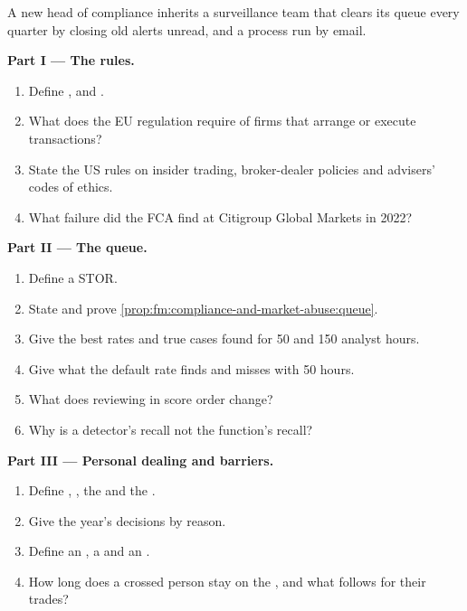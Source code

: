 \begin{problem}\label{pb:fm:compliance-and-market-abuse:1}
A new head of compliance inherits a surveillance team that clears its queue every quarter by closing old alerts unread, and a  process
run by email.

\medskip\noindent\textbf{Part I --- The rules.}
\begin{enumerate}
\item Define ,  and .
\item What does the EU regulation require of firms that arrange or execute transactions?
\item State the US rules on insider trading, broker-dealer policies and advisers' codes of ethics.
\item What failure did the FCA find at Citigroup Global Markets in 2022?
\end{enumerate}

\medskip\noindent\textbf{Part II --- The queue.}
\begin{enumerate}[resume]
\item Define a STOR.
\item State and prove \cref{prop:fm:compliance-and-market-abuse:queue}.
\item Give the best rates and true cases found for 50 and 150 analyst hours.
\item Give what the default rate finds and misses with 50 hours.
\item What does reviewing in score order change?
\item Why is a detector's recall not the function's recall?
\end{enumerate}

\medskip\noindent\textbf{Part III --- Personal dealing and barriers.}
\begin{enumerate}[resume]
\item Define , , the  and the .
\item Give the year's  decisions by reason.
\item Define an , a  and an .
\item How long does a crossed person stay on the , and what follows for their trades?
\end{enumerate}


\end{problem}
